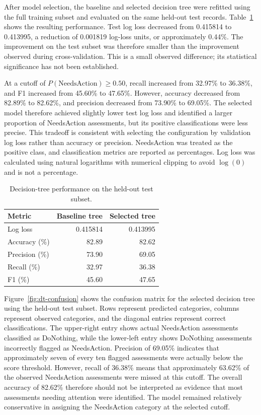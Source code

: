 \documentclass[NewProceedings,letterpaper,NoPageNumbers,NoLineNumbers, DoubleSpace]{ascelike-new}
\begin{document}
After model selection, the baseline and selected decision tree were refitted using the full training subset and evaluated on the same held-out test records. Table~\ref{tab:dt-performance} shows the resulting performance. Test log loss decreased from 0.415814 to 0.413995, a reduction of 0.001819 log-loss units, or approximately 0.44\%. The improvement on the test subset was therefore smaller than the improvement observed during cross-validation. This is a small observed difference; its statistical significance has not been established.

At a cutoff of $P(\mathrm{NeedsAction})\geq0.50$, recall increased from 32.97\% to 36.38\%, and F1 increased from 45.60\% to 47.65\%. However, accuracy decreased from 82.89\% to 82.62\%, and precision decreased from 73.90\% to 69.05\%. The selected model therefore achieved slightly lower test log loss and identified a larger proportion of NeedsAction assessments, but its positive classifications were less precise. This tradeoff is consistent with selecting the configuration by validation log loss rather than accuracy or precision. NeedsAction was treated as the positive class, and classification metrics are reported as percentages. Log loss was calculated using natural logarithms with numerical clipping to avoid $\log(0)$ and is not a percentage.

\begin{table}[htbp]
\centering
\caption{Decision-tree performance on the held-out test subset.}
\label{tab:dt-performance}
\small
\renewcommand{\arraystretch}{1.15}
\setlength{\tabcolsep}{8pt}
\begin{tabularx}{0.85\linewidth}{@{}>{\raggedright\arraybackslash}X r r@{}}
\toprule
\textbf{Metric} & \textbf{Baseline tree} & \textbf{Selected tree} \\
\midrule
Log loss       & 0.415814 & 0.413995 \\
Accuracy (\%)  & 82.89    & 82.62    \\
Precision (\%) & 73.90    & 69.05    \\
Recall (\%)    & 32.97    & 36.38    \\
F1 (\%)        & 45.60    & 47.65    \\
\bottomrule
\end{tabularx}
\end{table}

Figure~\ref{fig:dt-confusion} shows the confusion matrix for the selected decision tree using the held-out test subset. Rows represent predicted categories, columns represent observed categories, and the diagonal entries represent correct classifications. The upper-right entry shows actual NeedsAction assessments classified as DoNothing, while the lower-left entry shows DoNothing assessments incorrectly flagged as NeedsAction. Precision of 69.05\% indicates that approximately seven of every ten flagged assessments were actually below the score threshold. However, recall of 36.38\% means that approximately 63.62\% of the observed NeedsAction assessments were missed at this cutoff. The overall accuracy of 82.62\% therefore should not be interpreted as evidence that most assessments needing attention were identified. The model remained relatively conservative in assigning the NeedsAction category at the selected cutoff.
\end{document}
